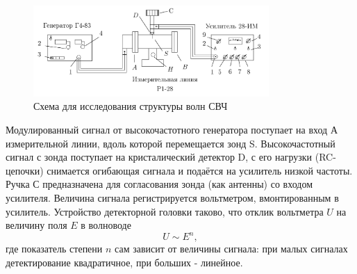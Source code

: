 \begin{figure}[H]
\centering
\includegraphics[width=0.8\textwidth]{2.png}
\caption{Схема для исследования структуры волн СВЧ}
\end{figure}

Модулированный сигнал от высокочастотного генератора поступает на вход А измерительной линии, вдоль которой перемещается зонд S. Высокочастотный сигнал с зонда поступает на кристалический детектор D, с его нагрузки (RC-цепочки) снимается огибающая сигнала и подаётся на усилитель низкой частоты. Ручка С предназначена для согласования зонда (как антенны) со входом усилителя. Величина сигнала регистрируется вольтметром, вмонтированным в усилитель.\n\n
Устройство детекторной головки таково, что отклик вольтметра $U$ на величину поля $E$ в волноводе
\[U \sim E^n,\]
где показатель степени $n$ сам зависит от величины сигнала: при малых сигналах детектирование квадратичное, при больших - линейное.

%
%

